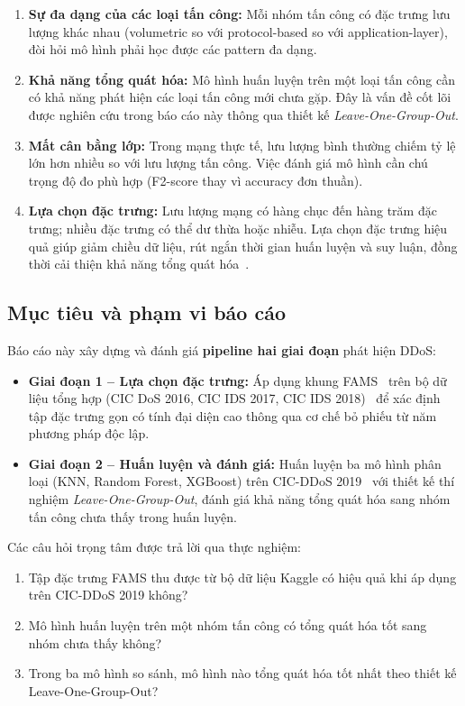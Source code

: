 \begin{enumerate}
    \item \textbf{Sự đa dạng của các loại tấn công:} Mỗi nhóm tấn công có đặc trưng lưu lượng khác nhau (volumetric so với protocol-based so với application-layer), đòi hỏi mô hình phải học được các pattern đa dạng.

    \item \textbf{Khả năng tổng quát hóa:} Mô hình huấn luyện trên một loại tấn công cần có khả năng phát hiện các loại tấn công mới chưa gặp. Đây là vấn đề cốt lõi được nghiên cứu trong báo cáo này thông qua thiết kế \textit{Leave-One-Group-Out}.

    \item \textbf{Mất cân bằng lớp:} Trong mạng thực tế, lưu lượng bình thường chiếm tỷ lệ lớn hơn nhiều so với lưu lượng tấn công. Việc đánh giá mô hình cần chú trọng độ đo phù hợp (F2-score thay vì accuracy đơn thuần).

    \item \textbf{Lựa chọn đặc trưng:} Lưu lượng mạng có hàng chục đến hàng trăm đặc trưng; nhiều đặc trưng có thể dư thừa hoặc nhiễu. Lựa chọn đặc trưng hiệu quả giúp giảm chiều dữ liệu, rút ngắn thời gian huấn luyện và suy luận, đồng thời cải thiện khả năng tổng quát hóa~\cite{ma2023fams}.
\end{enumerate}

\subsection{Mục tiêu và phạm vi báo cáo}

Báo cáo này xây dựng và đánh giá \textbf{pipeline hai giai đoạn} phát hiện DDoS:
\begin{itemize}
    \item \textbf{Giai đoạn 1 -- Lựa chọn đặc trưng:} Áp dụng khung FAMS~\cite{ma2023fams} trên bộ dữ liệu tổng hợp (CIC DoS 2016, CIC IDS 2017, CIC IDS 2018)~\cite{kaggle_ddos_dataset} để xác định tập đặc trưng gọn có tính đại diện cao thông qua cơ chế bỏ phiếu từ năm phương pháp độc lập.
    \item \textbf{Giai đoạn 2 -- Huấn luyện và đánh giá:} Huấn luyện ba mô hình phân loại (KNN, Random Forest, XGBoost) trên CIC-DDoS 2019~\cite{cicddos2019} với thiết kế thí nghiệm \textit{Leave-One-Group-Out}, đánh giá khả năng tổng quát hóa sang nhóm tấn công chưa thấy trong huấn luyện.
\end{itemize}

Các câu hỏi trọng tâm được trả lời qua thực nghiệm:
\begin{enumerate}
    \item Tập đặc trưng FAMS thu được từ bộ dữ liệu Kaggle có hiệu quả khi áp dụng trên CIC-DDoS 2019 không?
    \item Mô hình huấn luyện trên một nhóm tấn công có tổng quát hóa tốt sang nhóm chưa thấy không?
    \item Trong ba mô hình so sánh, mô hình nào tổng quát hóa tốt nhất theo thiết kế Leave-One-Group-Out?
\end{enumerate}

